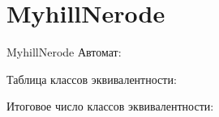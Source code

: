 \section{MyhillNerode}
\begin{frame}{MyhillNerode}
	Автомат:


	Таблица классов эквивалентности:


	Итоговое число классов эквивалентности:

\end{frame}
